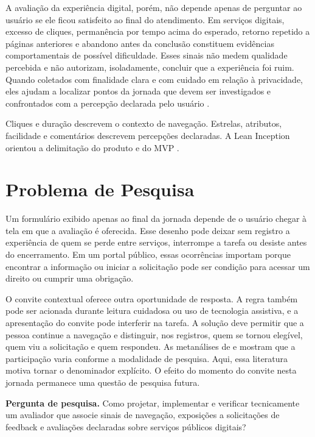 A avaliação da experiência digital, porém, não depende apenas de perguntar ao usuário se ele ficou satisfeito ao final do atendimento. Em serviços digitais, excesso de cliques, permanência por tempo acima do esperado, retorno repetido a páginas anteriores e abandono antes da conclusão constituem evidências comportamentais de possível dificuldade. Esses sinais não medem qualidade percebida e não autorizam, isoladamente, concluir que a experiência foi ruim. Quando coletados com finalidade clara e com cuidado em relação à privacidade, eles ajudam a localizar pontos da jornada que devem ser investigados e confrontados com a percepção declarada pelo usuário \cite{delone2003,gds2021medir,brasil2018}.

Cliques e duração descrevem o contexto de navegação. Estrelas, atributos, facilidade e comentários descrevem percepções declaradas. A Lean Inception orientou a delimitação do produto e do MVP \cite{caroli2018,fowler2022}.

\section{Problema de Pesquisa}
\label{sec:1.2}

Um formulário exibido apenas ao final da jornada depende de o usuário chegar à tela em que a avaliação é oferecida. Esse desenho pode deixar sem registro a experiência de quem se perde entre serviços, interrompe a tarefa ou desiste antes do encerramento. Em um portal público, essas ocorrências importam porque encontrar a informação ou iniciar a solicitação pode ser condição para acessar um direito ou cumprir uma obrigação.

O convite contextual oferece outra oportunidade de resposta. A regra também pode ser acionada durante leitura cuidadosa ou uso de tecnologia assistiva, e a apresentação do convite pode interferir na tarefa. A solução deve permitir que a pessoa continue a navegação e distinguir, nos registros, quem se tornou elegível, quem viu a solicitação e quem respondeu. As metanálises de  e  mostram que a participação varia conforme a modalidade de pesquisa. Aqui, essa literatura motiva tornar o denominador explícito. O efeito do momento do convite nesta jornada permanece uma questão de pesquisa futura.

\textbf{Pergunta de pesquisa.} Como projetar, implementar e verificar tecnicamente um avaliador que associe sinais de navegação, exposições a solicitações de feedback e avaliações declaradas sobre serviços públicos digitais?

